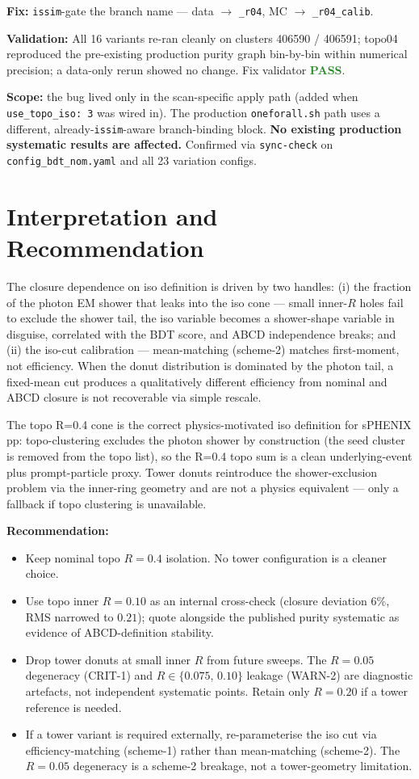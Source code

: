 \documentclass[11pt,a4paper]{article}
\newcommand{\pass}[1]{\textcolor{ForestGreen}{\textbf{#1}}}
\begin{document}
\textbf{Fix:} \texttt{issim}-gate the branch name --- data $\to$
\texttt{\_r04}, MC $\to$ \texttt{\_r04\_calib}.

\textbf{Validation:} All 16 variants re-ran cleanly on clusters
406590 / 406591; topo04 reproduced the pre-existing production purity
graph bin-by-bin within numerical precision; a data-only rerun
showed no change. Fix validator \pass{PASS}.

\textbf{Scope:} the bug lived only in the scan-specific apply path
(added when \texttt{use\_topo\_iso: 3} was wired in). The production
\texttt{oneforall.sh} path uses a different, already-\texttt{issim}-aware
branch-binding block. \textbf{No existing production systematic
results are affected.} Confirmed via \texttt{sync-check} on
\texttt{config\_bdt\_nom.yaml} and all 23 variation configs.

\section{Interpretation and Recommendation}

The closure dependence on iso definition is driven by two handles:
(i) the fraction of the photon EM shower that leaks into the iso
cone --- small inner-$R$ holes fail to exclude the shower tail, the
iso variable becomes a shower-shape variable in disguise,
correlated with the BDT score, and ABCD independence breaks; and
(ii) the iso-cut calibration --- mean-matching
(scheme-2) matches first-moment, not efficiency. When the donut
distribution is dominated by the photon tail, a fixed-mean cut
produces a qualitatively different efficiency from nominal and ABCD
closure is not recoverable via simple rescale.

The topo R=0.4 cone is the correct physics-motivated iso definition
for sPHENIX pp: topo-clustering excludes the photon shower by
construction (the seed cluster is removed from the topo list), so
the R=0.4 topo sum is a clean underlying-event plus prompt-particle
proxy. Tower donuts reintroduce the shower-exclusion problem via the
inner-ring geometry and are not a physics equivalent --- only a
fallback if topo clustering is unavailable.

\textbf{Recommendation:}
\begin{itemize}
\item Keep nominal topo $R=0.4$ isolation. No tower configuration is
  a cleaner choice.
\item Use topo inner $R=0.10$ as an internal cross-check
  (closure deviation $6\%$, RMS narrowed to $0.21$); quote alongside
  the published purity systematic as evidence of ABCD-definition
  stability.
\item Drop tower donuts at small inner $R$ from future sweeps. The
  $R=0.05$ degeneracy (CRIT-1) and $R\!\in\!\{0.075,\,0.10\}$
  leakage (WARN-2) are diagnostic artefacts, not independent
  systematic points. Retain only $R=0.20$ if a tower reference is
  needed.
\item If a tower variant is required externally, re-parameterise
  the iso cut via efficiency-matching (scheme-1) rather than
  mean-matching (scheme-2). The $R=0.05$ degeneracy is a
  scheme-2 breakage, not a tower-geometry limitation.
\end{itemize}
\end{document}
